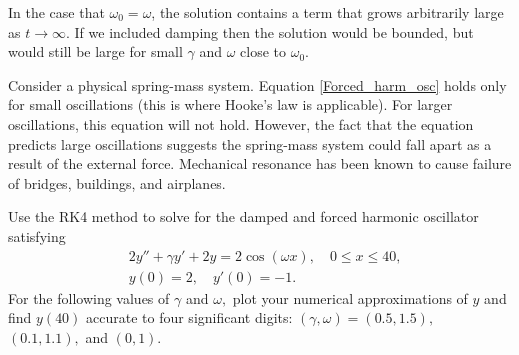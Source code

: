 In the case that $\omega_0 = \omega$, the solution contains a term that grows arbitrarily large as $t \to \infty$.
If we included damping then the solution would be bounded, but would still be large for small $\gamma$ and $\omega$ close to $\omega_0$.

Consider a physical spring-mass system.
Equation \ref{Forced_harm_osc} holds only for small oscillations (this is where Hooke's law is applicable).
For larger oscillations, this equation will not hold.
However, the fact that the equation predicts large oscillations suggests the spring-mass system could fall apart as a result of the external force. 
Mechanical resonance has been known to cause failure of bridges, buildings, and airplanes.

\begin{problem}
Use the RK4 method to solve for the damped and forced harmonic oscillator satisfying 
\begin{align*}
&{}2y'' + \gamma y' + 2y = 2 \cos (\omega x), \quad 0 \leq x \leq 40,\\
&{}y(0) = 2, \quad
y'(0) = -1.
\end{align*}
For the following values of $\gamma$ and $\omega,$ plot your numerical approximations of $y$ and find $y(40)$ accurate to four significant digits: $(\gamma, \omega) = (0.5, 1.5),$ $(0.1, 1.1),$ and $(0, 1).$
\end{problem}


